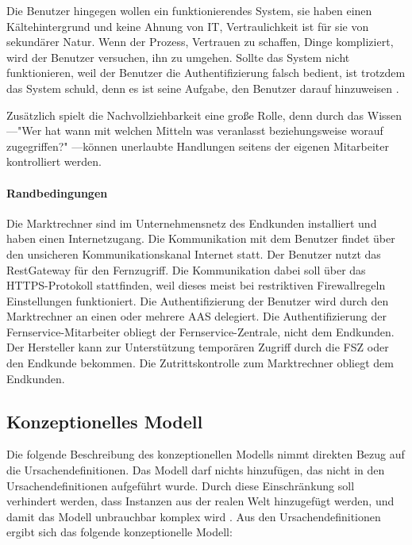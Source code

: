 \documentclass[11pt,a4paper]{report}
\begin{document}
Die Benutzer hingegen wollen ein funktionierendes System, sie haben einen Kältehintergrund und keine Ahnung von IT, Vertraulichkeit ist für sie von sekundärer Natur. Wenn der Prozess, Vertrauen zu schaffen, Dinge kompliziert, wird der Benutzer versuchen, ihn zu umgehen. Sollte das System nicht funktionieren, weil der Benutzer die Authentifizierung falsch bedient, ist trotzdem das System schuld, denn es ist seine Aufgabe, den Benutzer darauf hinzuweisen \cite[s.~5]{gutmann}. 

Zusätzlich spielt die Nachvollziehbarkeit eine große Rolle, denn durch das Wissen---"Wer hat wann mit welchen Mitteln was veranlasst beziehungsweise worauf zugegriffen?" \cite{bsi_m2110}---können unerlaubte Handlungen seitens der eigenen Mitarbeiter kontrolliert werden.

\paragraph{Randbedingungen} Die Marktrechner sind im Unternehmensnetz des Endkunden installiert und haben einen Internetzugang. Die Kommunikation mit dem Benutzer findet über den unsicheren Kommunikationskanal Internet statt. Der Benutzer nutzt das RestGateway für den Fernzugriff. Die Kommunikation dabei soll über das HTTPS-Protokoll stattfinden, weil dieses meist bei restriktiven Firewallregeln Einstellungen funktioniert. Die Authentifizierung der Benutzer wird durch den Marktrechner an einen oder mehrere AAS delegiert. Die Authentifizierung der Fernservice-Mitarbeiter obliegt der Fernservice-Zentrale, nicht dem Endkunden. Der Hersteller kann zur Unterstützung temporären Zugriff durch die FSZ oder den Endkunde bekommen. Die Zutrittskontrolle zum Marktrechner obliegt dem Endkunden.

\subsection{Konzeptionelles Modell}

Die folgende Beschreibung des konzeptionellen Modells nimmt direkten Bezug auf die Ursachendefinitionen. Das Modell darf nichts hinzufügen, das nicht in den Ursachendefinitionen aufgeführt wurde. Durch diese Einschränkung soll verhindert werden, dass Instanzen aus der realen Welt hinzugefügt werden, und damit das Modell unbrauchbar komplex wird \cite[s.~256]{gutmann}. Aus den Ursachendefinitionen ergibt sich das folgende konzeptionelle Modell:
\end{document}
